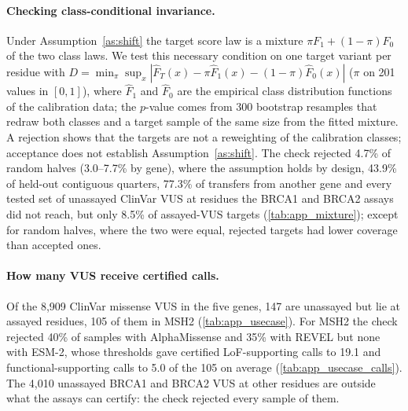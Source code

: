 \paragraph{Checking class-conditional invariance.} Under Assumption~\ref{as:shift} the target score law is a mixture
$\pi F_1+(1-\pi)F_0$ of the two class laws. We test this necessary condition on one target variant per residue with
$D=\min_{\pi}\sup_x|\hat F_T(x)-\pi\hat F_1(x)-(1-\pi)\hat F_0(x)|$ ($\pi$ on 201 values in $[0,1]$), where $\hat F_1$
and $\hat F_0$ are the empirical class distribution functions of the calibration data; the $p$-value comes from 300
bootstrap resamples that redraw both classes and a target sample of the same size from the fitted mixture. A
rejection shows that the targets are not a reweighting of the calibration classes; acceptance does not establish
Assumption~\ref{as:shift}. The check rejected 4.7\% of random halves (3.0--7.7\% by gene), where the assumption holds
by design, 43.9\% of held-out contiguous quarters, 77.3\% of transfers from another gene and every tested set of
unassayed ClinVar VUS at residues the BRCA1 and BRCA2 assays did not reach, but only 8.5\% of assayed-VUS targets
(\cref{tab:app_mixture}); except for random halves, where the two were equal, rejected targets had lower coverage than accepted ones.



\paragraph{How many VUS receive certified calls.} Of the 8,909 ClinVar missense VUS in the five genes, 147 are
unassayed but lie at assayed residues, 105 of them in MSH2 (\cref{tab:app_usecase}). For MSH2 the check rejected 40\% of
samples with AlphaMissense and 35\% with REVEL but none with ESM-2, whose thresholds gave certified LoF-supporting calls
to 19.1 and functional-supporting calls to 5.0 of the 105 on average (\cref{tab:app_usecase_calls}). The 4,010
unassayed BRCA1 and BRCA2 VUS at other residues are outside what the assays can certify: the check rejected every sample
of them.



